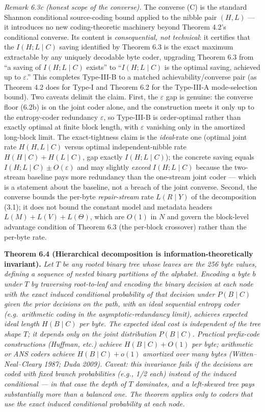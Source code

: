 \documentclass[
]{article}
\begin{document}
\emph{Remark 6.3c (honest scope of the converse).} The converse
(C) is the standard Shannon conditional source-coding bound applied
to the nibble pair $(H, L)$ --- it introduces no new coding-theoretic
machinery beyond Theorem 4.2's conditional converse. Its content is
\emph{consequential, not technical}: it certifies that the
$I(H ; L \mid C)$ saving identified by Theorem 6.3 is the exact
maximum extractable by any uniquely decodable byte coder, upgrading
Theorem 6.3 from ``a saving of $I(H;L\mid C)$ exists'' to ``$I(H;L
\mid C)$ is the optimal saving, achieved up to $\varepsilon$.'' This
completes Type-III-B to a matched achievability/converse pair (as
Theorem 4.2 does for Type-I and Theorem 6.2 for the Type-III-A
mode-selection bound). Two caveats delimit the claim. First, the
$\varepsilon$ gap is genuine: the converse floor (6.2b) is on the
joint coder alone, and the construction meets it only up to the
entropy-coder redundancy $\varepsilon$, so Type-III-B is order-optimal
rather than exactly optimal at finite block length, with $\varepsilon$
vanishing only in the amortized long-block limit. The exact-tightness
claim is the \emph{ideal}-rate one (optimal joint rate $H(H,L\mid C)$
versus optimal independent-nibble rate $H(H\mid C)+H(L\mid C)$, gap
exactly $I(H;L\mid C)$); the concrete saving equals
$I(H;L\mid C)\pm O(\varepsilon)$ and may slightly \emph{exceed}
$I(H;L\mid C)$ because the two-stream baseline pays more redundancy
than the one-stream joint coder --- which is a statement about the
baseline, not a breach of the joint converse.
Second, the converse bounds the per-byte \emph{repair-stream} rate
$L(R \mid Y)$ of the decomposition (3.1); it does not bound the
constant model and metadata headers $L(M) + L(V) + L(\Theta)$, which
are $O(1)$ in $N$ and govern the block-level advantage condition of
Theorem 6.3 (the per-block crossover) rather than the per-byte rate.

\textbf{Theorem 6.4 (Hierarchical decomposition is
information-theoretically invariant).} \emph{Let $T$ be any rooted
binary tree whose leaves are the 256 byte values, defining a sequence
of nested binary partitions of the alphabet. Encoding a byte $b$ under
$T$ by traversing root-to-leaf and encoding the binary decision at
each node with the \emph{exact induced conditional probability} of
that decision under $P(B \mid C)$ given the prior decisions on the
path, with an ideal sequential entropy coder (e.g.\ arithmetic
coding in the asymptotic-redundancy limit), achieves expected
\emph{ideal} length $H(B \mid C)$ per byte. The expected ideal cost
is independent of the tree shape $T$; it depends only on the joint
distribution $P(B \mid C)$. Practical prefix-code constructions
(Huffman, etc.) achieve $H(B \mid C) + O(1)$ per byte; arithmetic
or ANS coders achieve $H(B \mid C) + o(1)$ amortized over many
bytes (Witten--Neal--Cleary 1987; Duda 2009). \emph{Caveat:} this
invariance fails if the decisions are coded with fixed branch
probabilities (e.g., 1/2 each) instead of the induced conditional
--- in that case the depth of $T$ dominates, and a left-skewed tree
pays substantially more than a balanced one. The theorem applies
only to coders that use the \emph{exact} induced conditional
probability at each node.}
\end{document}
